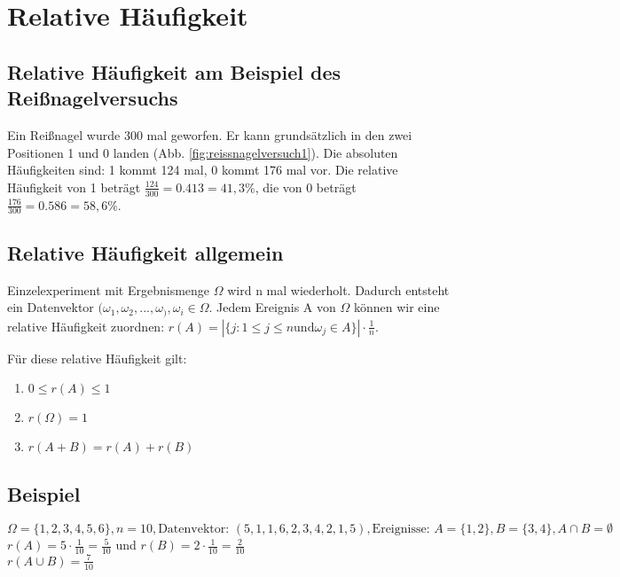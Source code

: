 \renewcommand{\ldate}{2015-10-06}

\section{Relative Häufigkeit}

\subsection{Relative Häufigkeit am Beispiel des Reißnagelversuchs}
Ein Reißnagel wurde 300 mal geworfen. Er kann grundsätzlich in den zwei Positionen 1 und 0 landen (Abb. \ref{fig:reissnagelversuch1}). Die absoluten Häufigkeiten sind: 1 kommt 124 mal, 0 kommt 176 mal vor. Die relative Häufigkeit von 1 beträgt $ \frac{124}{300}=0.413=41,3\% $, die von 0 beträgt $ \frac{176}{300}=0.586=58,6\% $.


\subsection{Relative Häufigkeit allgemein}
Einzelexperiment mit Ergebnismenge $ \Omega $ wird n mal wiederholt. Dadurch entsteht ein Datenvektor $ (\omega_1, \omega_2, ..., \omega_), \omega_i \in \Omega $.  Jedem Ereignis A von $ \Omega $ können wir eine relative Häufigkeit zuordnen: $ r(A) = |\{ j : 1\leq j\leq n \textrm{und} \omega_j \in A \}| \cdot \frac{1}{n} $. 

Für diese relative Häufigkeit gilt: 
\begin{enumerate}
\item $ 0\leq r(A)\leq 1 $
\item $ r(\Omega) = 1 $
\item $ r(A+B) = r(A) + r(B) $
\end{enumerate}

\subsection{Beispiel}
$ \Omega = \{ 1,2,3,4,5,6 \}, n=10, \textrm{Datenvektor: } (5,1,1,6,2,3,4,2,1,5), \textrm{Ereignisse: } A=\{ 1,2 \}, B=\{ 3,4 \}, A\cap B=\emptyset $\\
$ r(A) = 5 \cdot \frac{1}{10} = \frac{5}{10} $ und $ r(B)=2\cdot \frac{1}{10}=\frac{2}{10} $\\
$ r(A\cup B) = \frac{7}{10} $

